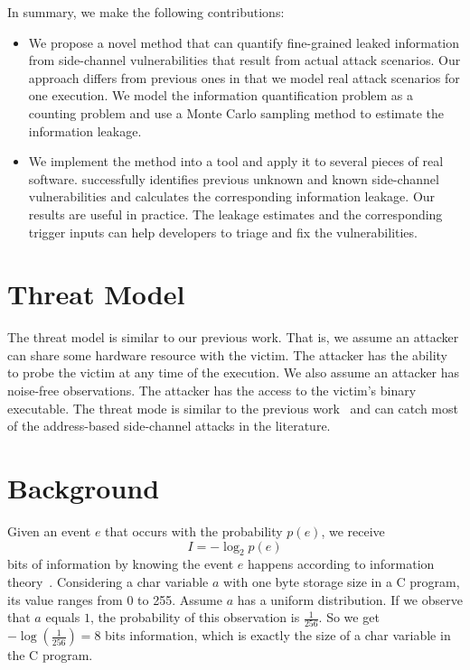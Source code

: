 In summary, we make the following contributions:

\begin{itemize}
    \item We propose a novel method that can quantify fine-grained leaked
          information from side-channel vulnerabilities that result from actual attack
          scenarios. Our approach differs from previous ones in that we
          model real attack scenarios for one execution.
          We model the information quantification problem as a counting problem
          and use a Monte Carlo sampling method to estimate the information leakage.

    \item We implement the method into a tool and apply it
          to several pieces of real software. \tool{} successfully identifies
          previous unknown and known side-channel vulnerabilities and calculates the corresponding information leakage.
          Our results are useful in practice.
          The leakage estimates and the corresponding trigger inputs can
          help developers to triage and fix the vulnerabilities.
\end{itemize}

\section{Threat Model}

The threat model is similar to our previous work. That is, we assume
an attacker can share some hardware resource with the victim. The attacker has
the ability to probe the victim at any time of the execution. We also assume
an attacker has noise-free observations. The attacker has the access to the victim's
binary executable. The threat mode is similar to
the previous work~\cite{203878,182946,Brotzman19Casym} and can catch most of
the address-based side-channel attacks in the literature.


\section{Background}
Given an event $e$ that occurs with the probability $p(e)$, we receive
\begin{displaymath}
    I = - \log_2p(e)
\end{displaymath}
bits of information by knowing the event $e$ happens according to information theory~\cite{shannon1948mathematical}.
Considering a char variable $a$
with one byte storage size in a C program, its value ranges from 0 to 255.
Assume $a$ has a uniform distribution. If we observe that
$a$ equals $1$, the probability of this observation is $\frac{1}{256}$. So
we get $-\log(\frac{1}{256}) = 8$ bits information, which is exactly the size
of a char variable in the C program.

